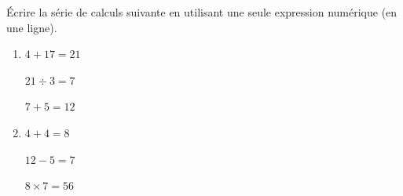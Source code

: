 \documentclass[exercice]{thedocument}%
\begin{document}
%
Écrire la série de calculs suivante en utilisant une seule expression numérique (en une ligne).
\begin{enumerate}
    \item \noindent
    $4+17=21$\par\noindent
    $21\div3=7$\par\noindent
    $7+5=12$\dotedline
    \item \noindent
    $4+4=8$\par\noindent
    $12-5=7$\par\noindent
    $8\times7=56$\dotedline
\end{enumerate}
\end{document}
